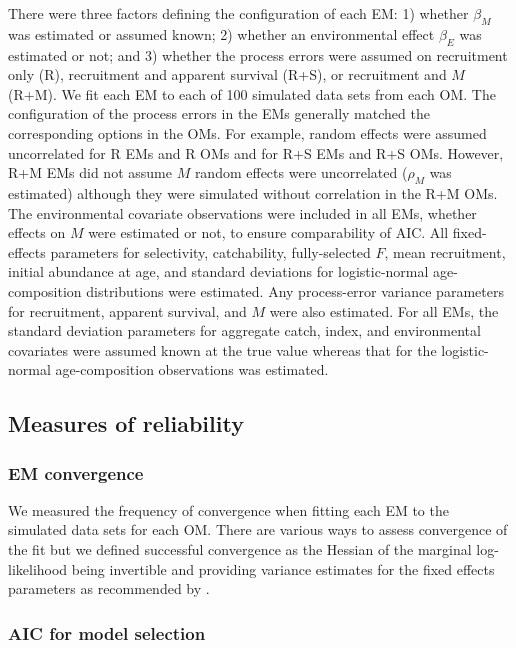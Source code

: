 \documentclass[
  12pt,
]{article}
\begin{document}
There were three factors defining the configuration of each EM: 1) whether \(\beta_M\) was estimated or assumed known; 2) whether an environmental effect \(\beta_E\) was estimated or not; and 3) whether the process errors were assumed on recruitment only (R), recruitment and apparent survival (R+S), or recruitment and \(M\) (R+M). We fit each EM to each of 100 simulated data sets from each OM. The configuration of the process errors in the EMs generally matched the corresponding options in the OMs. For example, random effects were assumed uncorrelated for R EMs and R OMs and for R+S EMs and R+S OMs. However, R+M EMs did not assume \(M\) random effects were uncorrelated (\(\rho_M\) was estimated) although they were simulated without correlation in the R+M OMs. The environmental covariate observations were included in all EMs, whether effects on \(M\) were estimated or not, to ensure comparability of AIC. All fixed-effects parameters for selectivity, catchability, fully-selected \(F\), mean recruitment, initial abundance at age, and standard deviations for logistic-normal age-composition distributions were estimated. Any process-error variance parameters for recruitment, apparent survival, and \(M\) were also estimated. For all EMs, the standard deviation parameters for aggregate catch, index, and environmental covariates were assumed known at the true value whereas that for the logistic-normal age-composition observations was estimated.

\subsection*{Measures of reliability}\label{measures-of-reliability}

\subsubsection*{EM convergence}\label{em-convergence}

We measured the frequency of convergence when fitting each EM to the simulated data sets for each OM. There are various ways to assess convergence of the fit \citep[e.g.,][]{carvalhoetal21} but we defined successful convergence as the Hessian of the marginal log-likelihood being invertible and providing variance estimates for the fixed effects parameters as recommended by \citet{milleretal_inreview1}.

\subsubsection*{AIC for model selection}\label{aic-for-model-selection}
\end{document}
